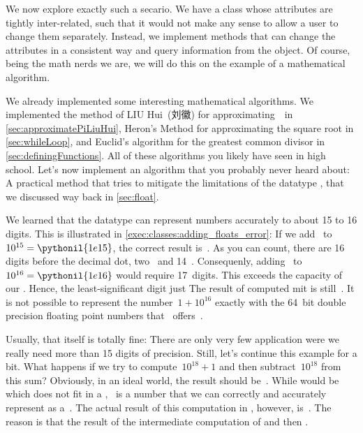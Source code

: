 We now explore exactly such a secario.
We have a class whose attributes are tightly inter-related, such that it would not make any sense to allow a user to change them separately.
Instead, we implement methods that can change the attributes in a consistent way and query information from the object.
Of course, being the math nerds we are, we will do this on the example of a mathematical algorithm.

We already implemented some interesting mathematical algorithms.
We implemented the method of LIU Hui~(刘徽) for approximating~\numberPi\ in \cref{sec:approximatePiLiuHui}, Heron's Method for approximating the square root in \cref{sec:whileLoop}, and Euclid's algorithm for the greatest common divisor in \cref{sec:definingFunctions}.
All of these algorithms you likely have seen in high school.
Let's now implement an algorithm that you probably never heard about:
A practical method that tries to mitigate the limitations of the datatype , that we discussed way back in \cref{sec:float}.

We learned that the datatype  can represent numbers accurately to about 15 to 16 digits.
This is illustrated in \cref{exec:classes:adding_floats_error}:
If we add~ to~$10^{15}=\pythonil{1e15}$, the correct result is~.
As you can count, there are 16 digits before the decimal dot, two~ and 14~.
Consequenly, adding~ to~$10^{16}=\pythonil{1e16}$ would require 17~digits.
This exceeds the capacity of our .
Hence, the least-significant digit just 
The result of  computed mit  is still~.
It is not possible to represent the number~$1+10^{16}$ exactly with the 64~bit double precision floating point numbers that \python\ offers~\cite{PSF:P3D:TPT:FPAIAL,IEEE2019ISFFPA,H1997IS7FPN}.

Usually, that itself is totally fine:
There are only very few application were we really need more than 15 digits of precision.
Still, let's continue this example for a bit.
What happens if we try to compute~$10^{18}+1$ and then subtract~$10^{18}$ from this sum?
Obviously, in an ideal world, the result should be~.
While  would be  which does not fit in a , ~is a number that we can correctly and accurately represent as a~.
The actual result of this computation in \python, however, is~.
The reason is that the result of the intermediate computation of  and then .

